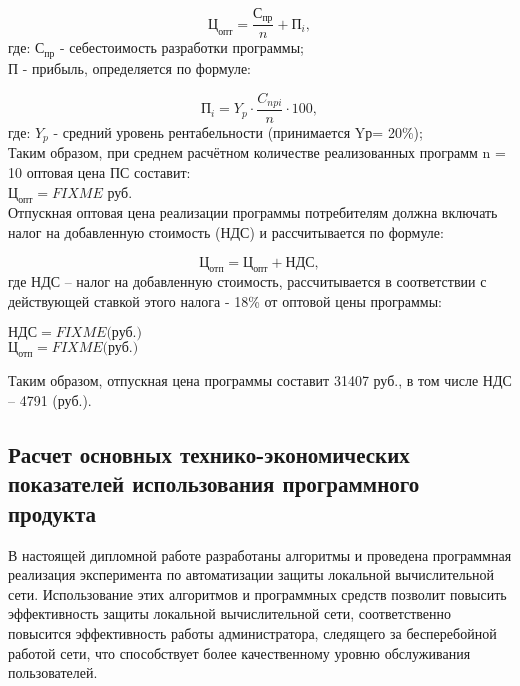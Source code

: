 \begin{equation}
\mbox{Ц}_{\mbox{опт}} = \frac{\mbox{С}_{\mbox{пр}}}{n} + \mbox{П}_i,
\end{equation}
где:	${\mbox{С}_{\mbox{пр}}}$ - себестоимость разработки программы; \\
	${\mbox{П}}$ - прибыль, определяется по формуле:

\begin{equation}
\mbox{П}_i = Y_p \cdot \frac{C_{npi}}{n} \cdot 100,
\end{equation}
где:	${Y_p}$ -  средний уровень рентабельности (принимается Yр= 20\%);\\

Таким образом, при среднем расчётном количестве реализованных программ n = 10 оптовая цена ПС составит: \\
${\mbox{Ц}_{\mbox{опт}} = FIXME}$ руб. \\

Отпускная оптовая цена реализации программы потребителям должна включать налог на добавленную
стоимость (НДС) и рассчитывается по формуле:

\begin{equation}
\mbox{Ц}_{\mbox{отп}} = \mbox{Ц}_{\mbox{опт}} + \mbox{НДС},
\end{equation}
где НДС – налог на добавленную стоимость,  рассчитывается в соответствии с действующей ставкой этого
налога - 18\% от оптовой цены программы:

\begin{center}
${\mbox{НДС} = FIXME \mbox{(руб.)}}$ \\
${\mbox{Ц}_{\mbox{отп}} = FIXME \mbox{(руб.)}}$
\end{center}

Таким образом, отпускная цена программы составит  31407  руб.,  в том числе НДС – 4791 (руб.).

\subsection{Расчет основных технико-экономических показателей использования программного продукта}
В настоящей дипломной работе  разработаны алгоритмы и проведена программная реализация эксперимента по
автоматизации защиты локальной вычислительной сети. Использование этих алгоритмов и программных средств 
позволит повысить эффективность защиты локальной вычислительной сети, соответственно повысится эффективность
работы администратора, следящего за бесперебойной работой сети, что способствует более качественному уровню
обслуживания пользователей.

